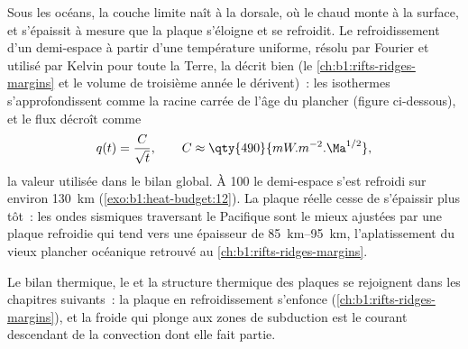 Sous les océans, la couche limite naît à la dorsale, où le  chaud monte à
la surface, et s'épaissit à mesure que la plaque s'éloigne et se refroidit. Le
refroidissement d'un demi-espace à partir d'une température uniforme, résolu par
Fourier et utilisé par Kelvin pour toute la Terre, la décrit bien (le
\cref{ch:b1:rifts-ridges-margins} et le volume de troisième année le dérivent)~:
les isothermes s'approfondissent comme la racine carrée de l'âge du plancher
(figure ci-dessous), et le flux décroît comme
\[
  q(t) = \frac{C}{\sqrt t}, \qquad C \approx \qty{490}{mW.m^{-2}.\Ma^{1/2}},
\]
la valeur utilisée dans le bilan global. %
À \qty{100}{\Ma} le demi-espace s'est refroidi sur environ \qty{130}{km} (\cref{exo:b1:heat-budget:12}). La plaque réelle cesse de s'épaissir plus tôt~: les ondes
sismiques traversant le Pacifique sont le mieux ajustées par une plaque refroidie qui tend vers une épaisseur de
\qtyrange{85}{95}{km}, l'aplatissement du vieux plancher océanique retrouvé au
\cref{ch:b1:rifts-ridges-margins}.

Le bilan thermique, le  et la structure thermique des plaques se
rejoignent dans les chapitres suivants~: la plaque en refroidissement s'enfonce
(\cref{ch:b1:rifts-ridges-margins}), et la  froide qui plonge aux
zones de subduction est le courant descendant de la convection dont elle fait
partie.


